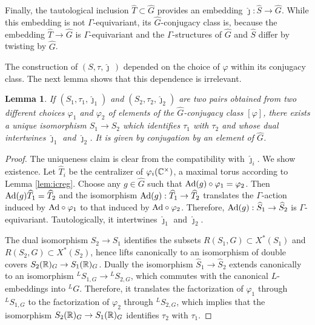 \documentclass{article}
\newtheorem{lem}[thm]{Lemma}
\theoremstyle{definition}
\newtheorem{cns}[thm]{Construction}
\numberwithin{equation}{section}
\renewcommand{\-}{\hyp{}}
\newcommand{\warn}[1]{{\leavevmode\color{red}[#1]}}
\begin{document}
Finally, the tautological inclusion $\hat T \subset \hat G$ provides an embedding $\hat\jmath : \hat S \to \hat G$. While this embedding is not $\Gamma$-equivariant, its $\hat G$-conjugacy class is, because the embedding $\hat T \to \hat G$ is $\Gamma$-equivariant and the $\Gamma$-structures of $\hat G$ and $\hat S$ differ by twisting by $\hat G$.

The construction of $(S,\tau,\hat\jmath\,)$ depended on the choice of $\varphi$ within its conjugacy class. The next lemma shows that this dependence is irrelevant.

\begin{lem} \label{lem:a}
If $(S_1,\tau_1,\hat\jmath_1)$ and $(S_2,\tau_2,\hat\jmath_2)$ are two pairs obtained from two different choices $\varphi_1$ and $\varphi_2$ of elements of the $\hat G$-conjugacy class $[\varphi]$, there exists a unique isomorphism $S_1 \to S_2$ which identifies $\tau_1$ with $\tau_2$ and whose dual intertwines $\hat\jmath_1$ and $\hat\jmath_2$. It is given by conjugation by an element of $\hat G$.
\end{lem}
\begin{proof}
	The uniqueness claim is clear from the compatibility with $\hat\jmath_i$. We show existence. Let $\hat T_i$ be the centralizer of $\varphi_i(\mathbb{C}^\times)$, a maximal torus according to Lemma \ref{lem:icreg}. Choose any $g \in \hat G$ such that $\textrm{Ad}(g) \circ\varphi_1=\varphi_2$. Then $\textrm{Ad}(g)\widehat T_1=\widehat T_2$ and the isomorphism $\textrm{Ad}(g) : \widehat T_1 \to \widehat T_2$ translates the $\Gamma$-action induced by $\textrm{Ad}\circ\varphi_1$ to that induced by $\textrm{Ad}\circ\varphi_2$. Therefore, $\textrm{Ad}(g) : \widehat S_1 \to \widehat S_2$ is $\Gamma$-equivariant. Tautologically, it intertwines $\hat\jmath_1$ and $\hat\jmath_2$.

	The dual isomorphism $S_2 \to S_1$ identifies the subsets $R(S_1,G) \subset X^*(S_1)$ and $R(S_2,G) \subset X^*(S_2)$, hence lifts canonically to an isomorphism of double covers $S_2(\mathbb{R})_G \to S_1(\mathbb{R})_G$. Dually the isomorphism $\hat S_1 \to \hat S_2$ extends canonically to an isomorphism $^LS_{1,G} \to {^LS_{2,G}}$, which commutes with the canonical $L$\-embeddings into $^LG$. Therefore, it translates the factorization of $\varphi_1$ through $^LS_{1,G}$ to the factorization of $\varphi_2$ through $^LS_{2,G}$, which implies that the isomorphism $S_2(\mathbb{R})_G \to S_1(\mathbb{R})_G$ identifies $\tau_2$ with $\tau_1$.
\end{proof}

	
\end{document}
